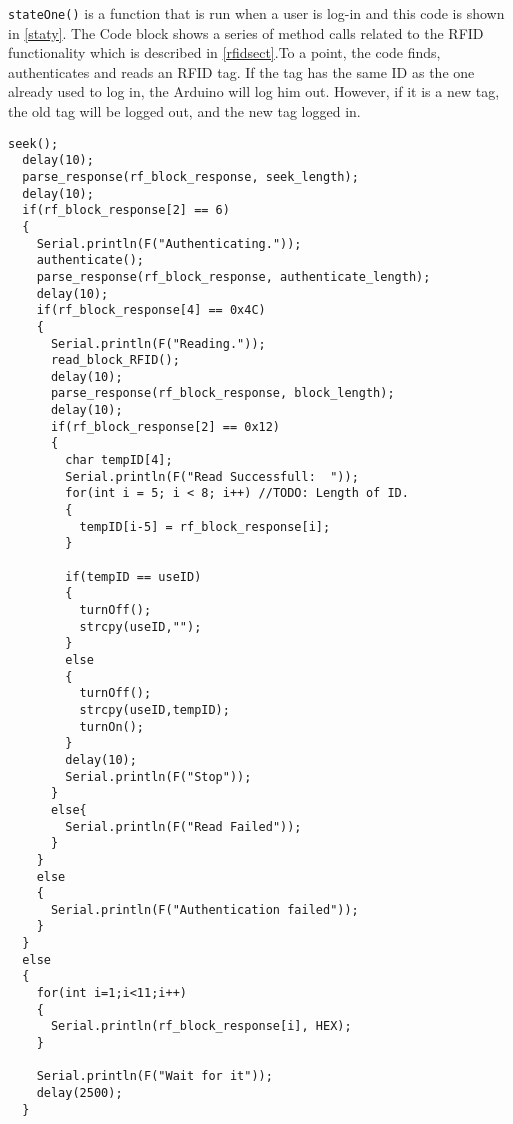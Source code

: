 \verb|stateOne()| is a function that is run when a user is log-in and this code is shown in \autoref{staty}.
The Code block shows a series of method calls related to the RFID functionality which is described in \autoref{rfidsect}.\newline To a point, the code finds, authenticates and reads an RFID tag. If the tag has the same ID as the one already used to log in, the Arduino will log him out. However, if it is a new tag, the old tag will be logged out, and the new tag logged in.
\begin{lstlisting}[frame=single, label=staty, caption=The Arduino state one code.]
  seek();
  delay(10);
  parse_response(rf_block_response, seek_length);
  delay(10);
  if(rf_block_response[2] == 6)
  {
    Serial.println(F("Authenticating."));
    authenticate();
    parse_response(rf_block_response, authenticate_length);
    delay(10);
    if(rf_block_response[4] == 0x4C)
    {
      Serial.println(F("Reading."));
      read_block_RFID();
      delay(10);
      parse_response(rf_block_response, block_length);
      delay(10);
      if(rf_block_response[2] == 0x12)
      {
        char tempID[4];
        Serial.println(F("Read Successfull:  "));
        for(int i = 5; i < 8; i++) //TODO: Length of ID.
        {        
          tempID[i-5] = rf_block_response[i];
        } 
        
        if(tempID == useID)
        {
          turnOff();
          strcpy(useID,"");
        }
        else
        {
          turnOff();
          strcpy(useID,tempID);
          turnOn();
        }
        delay(10);
        Serial.println(F("Stop"));
      }
      else{
        Serial.println(F("Read Failed"));
      }
    }
    else
    {
      Serial.println(F("Authentication failed"));
    }
  }
  else
  {
    for(int i=1;i<11;i++)
    {
      Serial.println(rf_block_response[i], HEX);
    }
    
    Serial.println(F("Wait for it"));  
    delay(2500);
  }
\end{lstlisting}